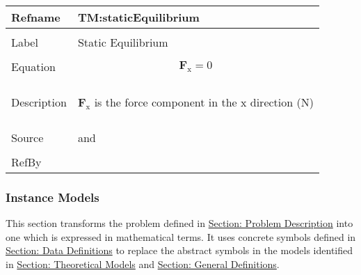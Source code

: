 \documentclass[12pt]{article}
\begin{document}
\vspace{\baselineskip}
\noindent
\begin{minipage}{\textwidth}
\begin{tabular}{>{\raggedright}p{}>{\raggedright\arraybackslash}p{}}
\toprule \textbf{Refname} & \textbf{TM:staticEquilibrium}
\label{TM:staticEquilibrium}
\\ \midrule \\
Label & Static Equilibrium
        
\\ \midrule \\
Equation & \begin{displaymath}
           {\mathbf{F}_{\text{x}}}=0
           \end{displaymath}
\\ \midrule \\
Description & \begin{symbDescription}
              \item{${\mathbf{F}_{\text{x}}}$ is the force component in the x direction (${\text{N}}$)}
              \end{symbDescription}
\\ \midrule \\
Source & \cite{mofjWiki} and \cite{momentWiki}
         
\\ \midrule \\
RefBy & 
\\ \bottomrule
\end{tabular}
\end{minipage}
\subsubsection{Instance Models}
\label{Sec:IMs}
This section transforms the problem defined in \hyperref[Sec:ProbDesc]{Section: Problem Description} into one which is expressed in mathematical terms. It uses concrete symbols defined in \hyperref[Sec:DDs]{Section: Data Definitions} to replace the abstract symbols in the models identified in \hyperref[Sec:TMs]{Section: Theoretical Models} and \hyperref[Sec:GDs]{Section: General Definitions}.
\end{document}
